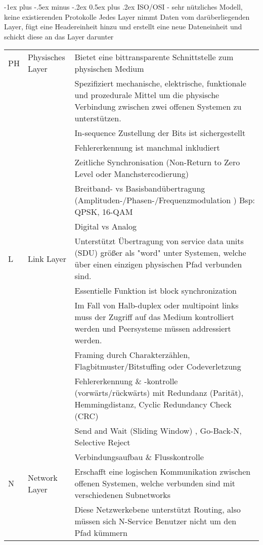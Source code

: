 \documentclass[10pt,landscape]{article}
\makeatletter
\renewcommand{\section}{\@startsection{section}{1}{0mm}%
                                {-1ex plus -.5ex minus -.2ex}%
                                {0.5ex plus .2ex}%
                                {\normalfont\large\bfseries}}
\makeatother
\begin{document}
\section{ISO/OSI - sehr nützliches Modell, keine existierenden Protokolle}
Jedes Layer nimmt Daten vom darüberliegenden Layer, fügt eine Headereinheit hinzu und erstellt eine neue Dateneinheit und schickt diese an das Layer darunter
\begin{tabular}{l | l | l}
    PH & Physisches Layer & 
        Bietet eine bittransparente Schnittstelle zum physischen Medium\\
        &&Spezifiziert mechanische, elektrische, funktionale und prozedurale Mittel um die physische Verbindung zwischen zwei offenen Systemen zu unterstützen.\\
        &&In-sequence Zustellung der Bits ist sichergestellt\\
        &&Fehlererkennung ist manchmal inkludiert\\
        && Zeitliche Synchronisation (Non-Return to Zero Level oder Manchstercodierung)\\
        && Breitband- vs Basisbandübertragung (Amplituden-/Phasen-/Frequenzmodulation ) Bsp: QPSK, 16-QAM  \\
        && Digital vs Analog \\
        \hline
    L & Link Layer & 
        Unterstützt Übertragung von service data units (SDU) größer als "word" unter Systemen, welche über einen einzigen physischen Pfad verbunden sind.\\
        &&Essentielle Funktion ist block synchronization\\
        &&Im Fall von Halb-duplex oder multipoint links muss der Zugriff auf das Medium kontrolliert werden und Peersysteme müssen addressiert werden.\\
        && Framing durch Charakterzählen, Flagbitmuster/Bitstuffing oder Codeverletzung \\
        && Fehlererkennung \& -kontrolle (vorwärts/rückwärts) mit Redundanz (Parität), Hemmingdistanz, Cyclic Redundancy Check (CRC)\\
        && Send and Wait (Sliding Window) , Go-Back-N, Selective Reject \\
        && Verbindungsaufbau \& Flusskontrolle \\
        \hline
    N & Network Layer & 
        Erschafft eine logischen Kommunikation zwischen offenen Systemen, welche verbunden sind mit verschiedenen Subnetworks\\
        &&Diese Netzwerkebene unterstützt Routing, also müssen sich N-Service Benutzer nicht um den Pfad kümmern\\

\end{tabular}
\end{document}

